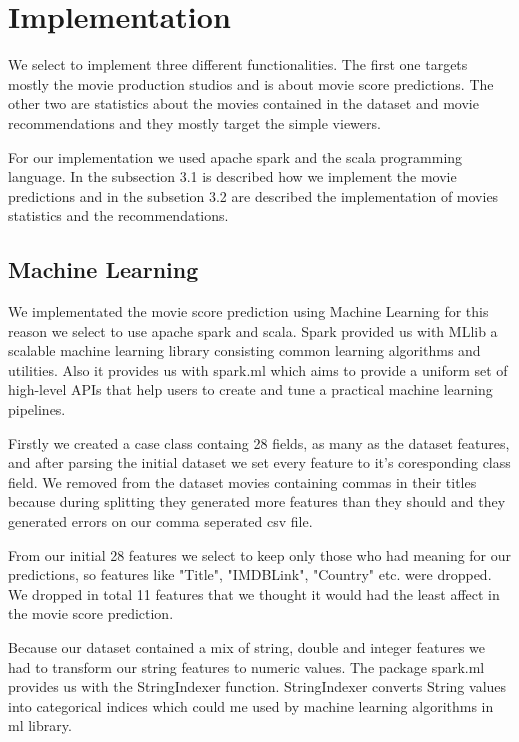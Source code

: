 \documentclass[letterpaper,twocolumn,10pt]{article}
\begin{document}
\section{Implementation}
We select to implement three different functionalities. The first one targets mostly the movie production studios and is about movie score predictions. The other two are statistics about the movies contained in the dataset and movie recommendations and they mostly target the simple viewers. \par 
For our implementation we used apache spark and the scala programming language. In the subsection 3.1 is described how we implement the movie predictions and in the subsetion 3.2 are described the implementation of movies statistics and the recommendations.

\subsection{Machine Learning}
We implementated the movie score prediction using Machine Learning for this reason we select to use apache spark and scala. Spark provided us with MLlib a scalable machine learning library consisting common learning algorithms and utilities. Also it provides us with spark.ml which aims to provide a uniform set of high-level APIs that help users to create and tune a practical machine learning pipelines. \par 

Firstly we created a case class containg 28 fields, as many as the dataset features, and after parsing the initial dataset we set every feature to it's coresponding class field. We removed from the dataset movies containing commas in their titles because during splitting they generated more features than they should and they generated errors on our comma seperated csv file.\par 

From our initial 28 features we select to keep only those who had meaning for our predictions, so features like "Title", "IMDBLink", "Country" etc. were dropped. We dropped in total 11 features that we thought it would had the least affect in the movie score prediction. \par 

Because our dataset contained a mix of string, double and integer features we had to transform our string features to numeric values. The package spark.ml provides us with the StringIndexer function. StringIndexer converts String values into categorical indices which could me used by machine learning algorithms in ml library.\par 
\end{document}
